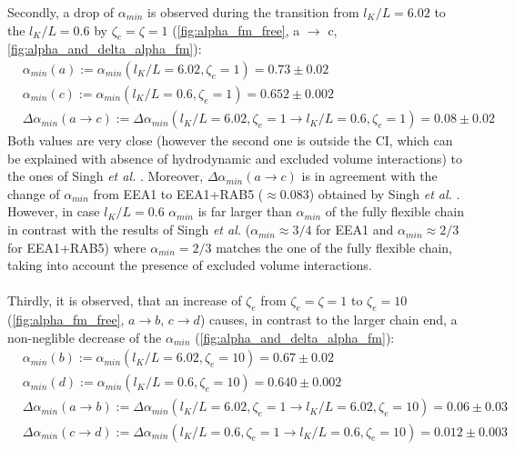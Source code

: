\documentclass[
    paper=A4,pagesize=automedia,fontsize=12pt,
    BCOR=15mm,DIV=22,
    twoside,headinclude,footinclude=false,
    fleqn,             %
    bibliography=totocnumbered,          %
    listof=totoc,                %
    listof=flat,                 %
    cleardoublepage=empty      %
    numbers=endperiod
]{scrartcl}
\begin{document}
Secondly, a drop of $\alpha_{min}$ is observed during the transition from $l_K/L=6.02$ to the $l_K/L=0.6$ by $\zeta_e=\zeta=1$ 
(\autoref{fig:alpha_fm_free}, a $\rightarrow$ c, \autoref{fig:alpha_and_delta_alpha_fm}):
\begin{equation} \label{eq:alpha_min_l_p_trans}
    \begin{aligned}
        & \alpha_{min}(a):= \alpha_{min}(l_K/L=6.02,\zeta_e=1) = 0.73\pm0.02 \\
        & \alpha_{min}(c):= \alpha_{min}(l_K/L=0.6,\zeta_e=1) = 0.652 \pm 0.002 \\
        & \Delta \alpha_{min} (a \rightarrow c) := \Delta \alpha_{min}(l_K/L=6.02,\zeta_e=1 \rightarrow l_K/L=0.6,\zeta_e=1) = 0.08 \pm 0.02
    \end{aligned}
\end{equation}  
Both values are very close 
(however the second one is outside the CI, 
which can be explained with absence of hydrodynamic and excluded volume interactions) to the ones
of Singh \emph{et al.} \cite{Singh:2022}. Moreover, $\Delta \alpha_{min} (a \rightarrow c)$
is in agreement with the change of $\alpha_{min}$ from EEA1 to EEA1+RAB5 ($\approx 0.083$)
obtained by Singh \emph{et al.} \cite{Singh:2022}.
However, in case $l_K/L=0.6$ $\alpha_{min}$ is
far larger than $\alpha_{min}$ of the fully flexible chain in contrast with the results
of Singh \emph{et al.} \cite{Singh:2022} ($\alpha_{min} \approx 3/4$ for EEA1 and 
$\alpha_{min} \approx 2/3$ for EEA1+RAB5) 
where $\alpha_{min}=2/3$ matches 
the one of the fully flexible chain, taking into account the presence of 
excluded volume interactions.
\\
\\
Thirdly, it is observed, that an
increase of $\zeta_e$ from $\zeta_e=\zeta=1$ to $\zeta_e=10$ 
(\autoref{fig:alpha_fm_free}, $a \rightarrow b$, $c \rightarrow d$) causes, in contrast
to the larger chain end, a non-neglible decrease of the $\alpha_{min}$ (\autoref{fig:alpha_and_delta_alpha_fm}):
\begin{equation}
    \begin{aligned} \label{eq:alpha_min_zeta_e_trans}
        & \alpha_{min}(b) := \alpha_{min}(l_K/L=6.02, \zeta_e=10) = 0.67 \pm 0.02 \\
        & \alpha_{min}(d) := \alpha_{min}(l_K/L=0.6, \zeta_e=10) = 0.640 \pm 0.002 \\
        & \Delta \alpha_{min}(a \rightarrow b) := \Delta \alpha_{min}(l_K/L=6.02,\zeta_e=1 \rightarrow l_K/L=6.02,\zeta_e=10) = 0.06\pm0.03\\
        & \Delta \alpha_{min}(c \rightarrow d) := \Delta \alpha_{min}(l_K/L=0.6,\zeta_e=1 \rightarrow l_K/L=0.6,\zeta_e=10) = 0.012\pm0.003
    \end{aligned}
\end{equation}
\end{document}
